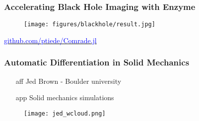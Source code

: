 \documentclass[11pt]{beamer}
\begin{document}
\begin{frame}
	\frametitle{Accelerating Black Hole Imaging with Enzyme}

	\begin{figure}
		\texttt{[image: figures/blackhole/result.jpg]}
	\end{figure}

	\href{https://github.com/ptiede/Comrade.jl}{\textcolor{blue}{github.com/ptiede/Comrade.jl}}

\end{frame}

\begin{frame}
	\frametitle{Automatic Differentiation in Solid Mechanics}

	\begin{minipage}{0.48\linewidth}
		\begin{itemize}
			\item[aff] Jed Brown - Boulder university
			\item[app] Solid mechanics simulations
		\end{itemize}
	\end{minipage}
	\hfill
	\begin{minipage}{0.50\linewidth}
		\begin{figure}
			\texttt{[image: jed\_wcloud.png]}
		\end{figure}
	\end{minipage}
\end{frame}
\end{document}
